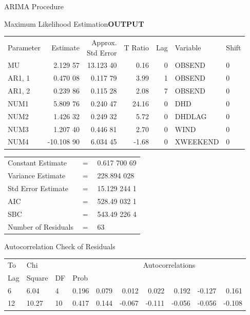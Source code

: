 \begin{mvbox}
{\ttfamily\small
ARIMA Procedure\par
\vspace{10pt}
Maximum Likelihood Estimation\hfill\textbf{\rmfamily OUTPUT}\par
\vspace{10pt}
{\centering
\begin{tabular}{lrrrrll}
Parameter & Estimate & \makecell{Approx.\\Std Error} & T Ratio & Lag & Variable & Shift\\
MU & 2.129 57 & 13.123 40 & 0.16 & 0 & OBSEND & 0\\
AR1, 1 & 0.470 08 & 0.117 79 & 3.99 & 1 & OBSEND & 0\\
AR1, 2 & 0.239 86 & 0.115 28 & 2.08 & 7 & OBSEND & 0\\
NUM1 & 5.809 76 & 0.240 47 & 24.16 & 0 & DHD & 0\\
NUM2 & 1.426 32 & 0.249 32 & 5.72 & 0 & DHDLAG & 0\\
NUM3 & 1.207 40 & 0.446 81 & 2.70 & 0 & WIND & 0\\
NUM4 & -10.108 90 & 6.034 45 & -1.68 & 0 & XWEEKEND & 0\\
\end{tabular}\par}
\vspace{10pt}
{\centering
\begin{tabular}{lll}
Constant Estimate & $=$ & 0.617 700 69\\
Variance Estimate & $=$ & 228.894 028\\
Std Error Estimate & $=$ & 15.129 244 1\\
AIC & $=$ & 528.49 032 1\\
SBC & $=$ & 543.49 226 4\\
Number of Residuals & $=$ & 63\\
\end{tabular}\par}
\vspace{12pt}
Autocorrelation Check of Residuals\par
\vspace{8pt}
{\centering
\begin{tabular}{llllrrrrrr}
To & Chi & & & \multicolumn{6}{c}{Autocorrelations}\\
Lag & Square & DF & Prob & & & & & &\\
6 & 6.04 & 4 & 0.196 & 0.079 & 0.012 & 0.022 & 0.192 & -0.127 & 0.161\\
12 & 10.27 & 10 & 0.417 & 0.144 & -0.067 & -0.111 & -0.056 & -0.056 & -0.108\\

\end{tabular}}}
\end{mvbox}
